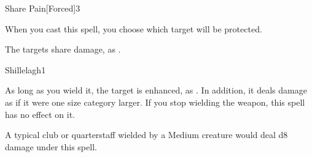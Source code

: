 \begin{spellfooter}
\begin{spellsection}{Share Pain}[Forced]{3}
    \begin{spellheader}
        \begin{spelltargetinginfo}
        \end{spelltargetinginfo}
        \begin{spelleffects}
            \spellspecial When you cast this spell, you choose which target will be protected.
        \end{spelleffects}
    \end{spellheader}
    \begin{spellcontent}
        \begin{spellmargin}
            \spellsuccess The targets share damage, as .
        \end{spellmargin}
        \spelldur \durlong \dismissable
    \end{spellcontent}
    \begin{spellfooter}
    \end{spellfooter}
\end{spellsection}

\begin{spellsection}{Shillelagh}{1}
    \begin{spellheader}
        \begin{spelltargetinginfo}
        \end{spelltargetinginfo}
    \end{spellheader}
    \begin{spellcontent}
        \begin{spelleffects}
            \spelleffect As long as you wield it, the target is enhanced, as . In addition, it deals damage as if it were one size category larger. If you stop wielding the weapon, this spell has no effect on it.
            \spelldur \durshort
        \end{spelleffects}
    \end{spellcontent}
    \begin{spellfooter}
        \spellnotes A typical club or quarterstaff wielded by a Medium creature would deal d8 damage under this spell.
    \end{spellfooter}
\end{spellsection}


\end{spellfooter}
